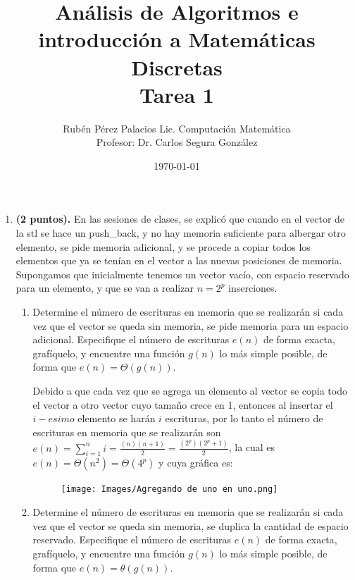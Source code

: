 \documentclass[letterpaper]{article}
\title{Análisis de Algoritmos e introducción a Matemáticas Discretas \\ Tarea 1}
\author{Rubén Pérez Palacios Lic. Computación Matemática\\Profesor: Dr. Carlos Segura González}
\date{\today}
\theoremstyle{definition}
\theoremstyle{lemathm}
\theoremstyle{lemathm}
\theoremstyle{lemathm}
\theoremstyle{lemademthm}
\newcommand{\pars}[1]{\left( #1 \right) }
\newcommand{\1}{\mathbbm{1}}
\begin{document}
	\maketitle

    \begin{enumerate}[label=\textbf{Problema \arabic*}]
        \item \textbf{(2 puntos).} En las sesiones de clases, se explicó que cuando en el vector de la stl se hace un push\_back, y no hay memoria suficiente para albergar otro elemento, se pide memoria adicional, y se procede a copiar todos los elementos que ya se tenían en el vector a las nuevas posiciones de memoria. Supongamos que inicialmente tenemos un vector vacío, con espacio reservado para un elemento, y que se van a realizar $n = 2^p$ inserciones.
        
        \begin{enumerate}
            \item Determine el número de escrituras en memoria que se realizarán si cada vez que el vector se queda sin memoria, se pide memoria para un espacio adicional. Especifique el número de escrituras $e\pars{n}$ de forma exacta, grafíquelo, y encuentre una función $g\pars{n}$ lo más simple posible, de forma que $e\pars{n} = \Theta\pars{g\pars{n}}$.
            
			Debido a que cada vez que se agrega un elemento al vector se copia todo el vector a otro vector cuyo tamaño crece en 1, entonces al insertar el $i-esimo$ elemento se harán $i$ escrituras, por lo tanto el número de escrituras en memoria que se realizarán son $e\pars{n} = \sum_{i=1}^n i = \frac{\pars{n}\pars{n+1}}{2} = \frac{\pars{2^{p}}\pars{2^{p}+1}}{2}$, la cual es $e\pars{n} = \Theta(n^{2}) = \Theta(4^{p})$ y cuya gráfica es:

			\begin{figure}[H]
				\begin{center}
					\texttt{[image: Images/Agregando de uno en uno.png]}
				\end{center}
			\end{figure}

			
            \item Determine el número de escrituras en memoria que se realizarán si cada vez que el vector se queda sin memoria, se duplica la cantidad de espacio reservado. Especifique el número de escrituras $e\pars{n}$ de forma exacta, grafíquelo, y encuentre una función $g\pars{n}$ lo más simple posible, de forma que $e\pars{n} = \theta\pars{g\pars{n}}$.
            

\end{enumerate}
\end{enumerate}
\end{document}
